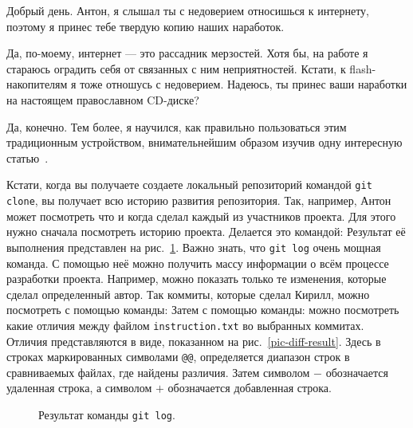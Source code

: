 \documentclass[14pt,a4paper]{article}
\begin{document}

 Добрый день. Антон, я слышал ты с недоверием относишься к интернету, поэтому я принес
тебе твердую копию наших наработок. 

 Да, по-моему, интернет --- это рассадник мерзостей. 
Хотя бы, на работе я стараюсь оградить себя от связанных с ним неприятностей. 
Кстати, к flash-накопителям я тоже отношусь с недоверием. Надеюсь, ты принес ваши наработки
на настоящем православном CD-диске? 

 Да, конечно. Тем более, я научился, как правильно пользоваться
этим традиционным устройством, внимательнейшим образом изучив одну интересную статью~\cite{bib:svyat-cdrecord}.



 Кстати, когда вы получаете создаете локальный репозиторий командой \texttt{git clone}, 
вы получает всю историю развития репозитория. Так, например, Антон может посмотреть что и когда 
сделал каждый из участников проекта. Для этого нужно сначала посмотреть историю проекта.
Делается это командой:  Результат её выполнения представлен
на рис.~\ref{pic-git-log}.
Важно знать, что \texttt{git log} очень мощная команда. С помощью неё можно получить массу информации
о всём процессе разработки проекта. Например, можно показать только те изменения, которые сделал 
определенный автор. Так коммиты, которые сделал Кирилл, можно посмотреть с помощью команды:
Затем с помощью команды:
можно посмотреть какие отличия между файлом \texttt{instruction.txt} во выбранных коммитах.
Отличия представляются в виде, показанном на рис.~\ref{pic-diff-result}.
Здесь в строках маркированных символами \texttt{@@}, определяется диапазон строк в сравниваемых
файлах, где найдены различия. Затем символом $-$ обозначается удаленная строка, а символом $+$
обозначается добавленная строка. 
\begin{figure}
	\centering
	\caption{Результат команды \texttt{git log}.}
	\label{pic-git-log}
\end{figure}
\end{document}
